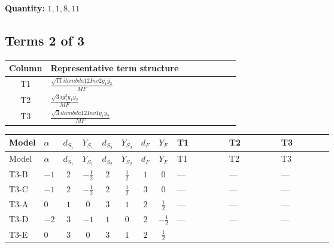 \documentclass[8pt]{article}
\begin{document}
\begin{landscape}
\begin{longtable}{@{}llcccccc >{\raggedright\arraybackslash}p{0.21\linewidth} >{\raggedright\arraybackslash}p{0.21\linewidth} >{\raggedright\arraybackslash}p{0.21\linewidth}@{}}
\midrule
\bottomrule
\end{longtable}
\clearpage
\noindent\textbf{Quantity: }$\mathrm{1,1,8,11}$\par\smallskip
\subsection*{Terms 2 of 3}
\begin{center}
\begin{tabular}{@{}c >{\raggedright\arraybackslash}p{0.82\linewidth}@{}}
\toprule
Column & Representative term structure \\
\midrule
T1 & \(\displaystyle \frac{\sqrt{11} i lambda12Inv2 \overline{y_{1}} \overline{y_{2}}}{MF}\) \\
\midrule
T2 & \(\displaystyle \frac{\sqrt{3} i g_{1}^{2} \overline{y_{1}} \overline{y_{2}}}{MF}\) \\
\midrule
T3 & \(\displaystyle \frac{\sqrt{3} i lambda12Inv1 \overline{y_{1}} \overline{y_{2}}}{MF}\) \\
\midrule
\bottomrule
\end{tabular}
\end{center}
\smallskip
\tiny
\begin{longtable}{@{}llcccccc >{\raggedright\arraybackslash}p{0.21\linewidth} >{\raggedright\arraybackslash}p{0.21\linewidth} >{\raggedright\arraybackslash}p{0.21\linewidth}@{}}
\toprule
Model & $\alpha$ & $d_{S_1}$ & $Y_{S_1}$ & $d_{S_2}$ & $Y_{S_2}$ & $d_F$ & $Y_F$ & T1 & T2 & T3 \\
\midrule
\endfirsthead
\toprule
Model & $\alpha$ & $d_{S_1}$ & $Y_{S_1}$ & $d_{S_2}$ & $Y_{S_2}$ & $d_F$ & $Y_F$ & T1 & T2 & T3 \\
\midrule
\endhead
T3-B & $-1$ & $2$ & $-\frac{1}{2}$ & $2$ & $\frac{1}{2}$ & $1$ & $0$ & --- & --- & --- \\
\midrule
T3-C & $-1$ & $2$ & $-\frac{1}{2}$ & $2$ & $\frac{1}{2}$ & $3$ & $0$ & --- & --- & --- \\
\midrule
T3-A & $0$ & $1$ & $0$ & $3$ & $1$ & $2$ & $\frac{1}{2}$ & --- & --- & --- \\
\midrule
T3-D & $-2$ & $3$ & $-1$ & $1$ & $0$ & $2$ & $-\frac{1}{2}$ & --- & --- & --- \\
\midrule
T3-E & $0$ & $3$ & $0$ & $3$ & $1$ & $2$ & $\frac{1}{2}$ & \scriptsize\adjustbox{max width=\linewidth}{$\begin{gathered} - \frac{3 \sqrt{11} i lambda12Inv2 \overline{y_{1}} \overline{y_{2}}}{22 MF}\end{gathered}$} & \scriptsize\adjustbox{max width=\linewidth}{$\begin{gathered} - \frac{\sqrt{3} i g_{1}^{2} \overline{y_{1}} \overline{y_{2}}}{8 MF}\end{gathered}$} & \scriptsize\adjustbox{max width=\linewidth}{$\begin{gathered} \frac{\sqrt{3} i lambda12Inv1 \overline{y_{1}} \overline{y_{2}}}{6 MF}\end{gathered}$} \\

\end{longtable}
\end{landscape}
\end{document}
